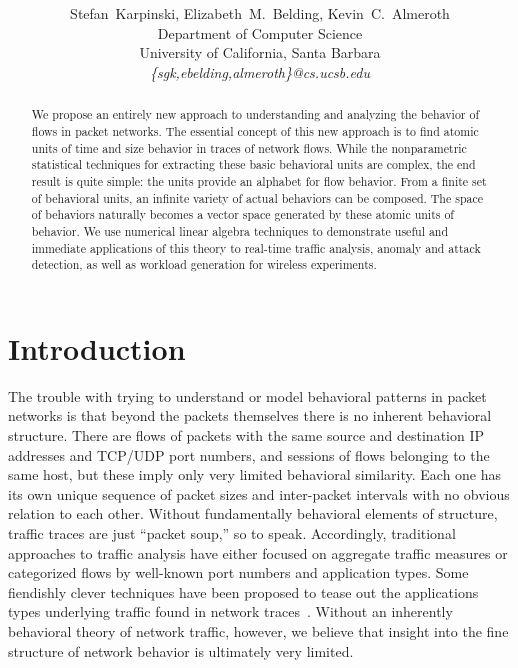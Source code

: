 \documentclass[conference]{IEEEtran}
\title{
\vspace{-0.25em}
\thetitle
}
\author{
{\large{Stefan~Karpinski, Elizabeth~M.~Belding, Kevin~C.~Almeroth}} \vspace{0.25em}\\
Department of Computer Science \\
University of California, Santa Barbara \vspace{0.35em}\\
\textit{\{sgk,ebelding,almeroth\}@cs.ucsb.edu}
}
\newcommand{\caps}[1]{{\small{#1}}}
\begin{document}
\maketitle

\begin{abstract}
We propose an entirely new approach to understanding and analyzing the behavior of flows in packet networks. The essential concept of this new approach is to find atomic units of time and size behavior in traces of network flows. While the nonparametric statistical techniques for extracting these basic behavioral units are complex, the end result is quite simple: the units provide an alphabet for flow behavior. From a finite set of behavioral units, an infinite variety of actual behaviors can be composed. The space of behaviors naturally becomes a vector space generated by these atomic units of behavior. We use numerical linear algebra techniques to demonstrate useful and immediate applications of this theory to real-time traffic analysis, anomaly and attack detection, as well as workload generation for wireless experiments.
\end{abstract}

\section{Introduction}\label{sec:intro}

The trouble with trying to understand or model behavioral patterns in packet networks is that beyond the packets themselves there is no inherent behavioral structure. There are flows of packets with the same source and destination \caps{IP} addresses and \caps{TCP/UDP} port numbers, and sessions of flows belonging to the same host, but these imply only very limited behavioral similarity. Each one has its own unique sequence of packet sizes and inter-packet intervals with no obvious relation to each other. Without fundamentally behavioral elements of structure, traffic traces are just ``packet soup,'' so to speak. Accordingly, traditional approaches to traffic analysis have either focused on aggregate traffic measures or categorized flows by well-known port numbers and application types. Some fiendishly clever techniques have been proposed to tease out the applications types underlying traffic found in network traces~\cite{Karagiannis05}. Without an inherently behavioral theory of network traffic, however, we believe that insight into the fine structure of network behavior is ultimately very limited.
\end{document}
